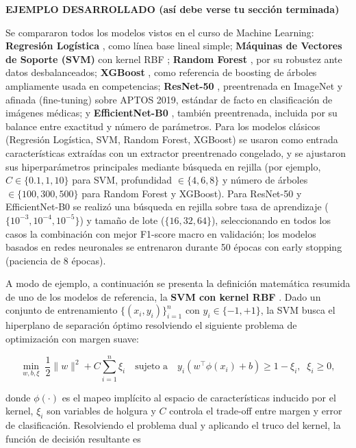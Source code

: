 \documentclass[pdflatex,sn-mathphys-num]{sn-jnl}
\newenvironment{ejemplo}{%
  \par\noindent\textbf{\color{green!35!black}EJEMPLO DESARROLLADO (así debe verse tu sección terminada)}%
  \par\vspace{2pt}\noindent\small
}{%
  \par\normalfont\vspace{6pt}
}
\begin{document}
\begin{ejemplo}
Se compararon todos los modelos vistos en el curso de Machine Learning: \textbf{Regresión Logística} \cite{bib5}, como línea base lineal simple; \textbf{Máquinas de Vectores de Soporte (SVM)} con kernel RBF \cite{bib6}; \textbf{Random Forest} \cite{bib7}, por su robustez ante datos desbalanceados; \textbf{XGBoost} \cite{bib8}, como referencia de boosting de árboles ampliamente usada en competencias; \textbf{ResNet-50} \cite{bib1}, preentrenada en ImageNet y afinada (fine-tuning) sobre APTOS 2019, estándar de facto en clasificación de imágenes médicas; y \textbf{EfficientNet-B0} \cite{bib2}, también preentrenada, incluida por su balance entre exactitud y número de parámetros. Para los modelos clásicos (Regresión Logística, SVM, Random Forest, XGBoost) se usaron como entrada características extraídas con un extractor preentrenado congelado, y se ajustaron sus hiperparámetros principales mediante búsqueda en rejilla (por ejemplo, $C \in \{0.1, 1, 10\}$ para SVM, profundidad $\in \{4, 6, 8\}$ y número de árboles $\in \{100, 300, 500\}$ para Random Forest y XGBoost). Para ResNet-50 y EfficientNet-B0 se realizó una búsqueda en rejilla sobre tasa de aprendizaje ($\{10^{-3}, 10^{-4}, 10^{-5}\}$) y tamaño de lote ($\{16, 32, 64\}$), seleccionando en todos los casos la combinación con mejor F1-score macro en validación; los modelos basados en redes neuronales se entrenaron durante 50 épocas con early stopping (paciencia de 8 épocas).

A modo de ejemplo, a continuación se presenta la definición matemática resumida de uno de los modelos de referencia, la \textbf{SVM con kernel RBF} \cite{bib6}. Dado un conjunto de entrenamiento $\{(x_i, y_i)\}_{i=1}^{n}$ con $y_i \in \{-1, +1\}$, la SVM busca el hiperplano de separación óptimo resolviendo el siguiente problema de optimización con margen suave:

\begin{equation}
\min_{w, b, \xi} \; \frac{1}{2}\lVert w \rVert^2 + C\sum_{i=1}^{n}\xi_i \quad \text{sujeto a} \quad y_i(w^\top \phi(x_i) + b) \geq 1 - \xi_i, \;\; \xi_i \geq 0,
\label{eq:svm_primal}
\end{equation}

\noindent donde $\phi(\cdot)$ es el mapeo implícito al espacio de características inducido por el kernel, $\xi_i$ son variables de holgura y $C$ controla el trade-off entre margen y error de clasificación. Resolviendo el problema dual y aplicando el truco del kernel, la función de decisión resultante es


\end{ejemplo}
\end{document}
